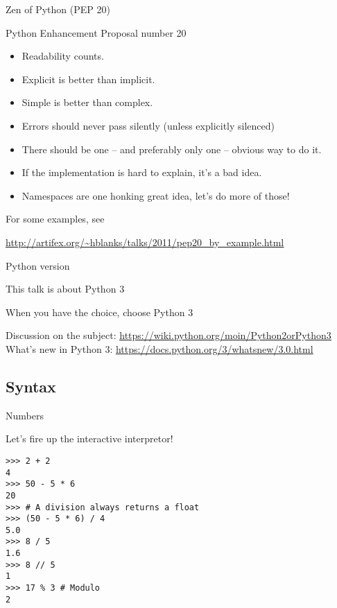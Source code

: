 \documentclass[ignorenonframetext,]{beamer}
\newcommand{\myurl}[1]{\textcolor{blue}{\underline{\url{#1}}}}
\begin{document}
\begin{frame}{Zen of Python (PEP 20)}

    Python Enhancement Proposal number 20

    \begin{itemize}[<+-| alert@+>]
        \item Readability counts.
        \item Explicit is better than implicit.
        \item Simple is better than complex.
        \item Errors should never pass silently (unless explicitly silenced)
        \item There should be one -- and preferably only one -- obvious way to do it.
        \item If the implementation is hard to explain, it's a bad idea.
        \item Namespaces are one honking great idea, let's do more of those!
    \end{itemize}
\end{frame}

\begin{frame}%

    For some examples, see

    \myurl{http://artifex.org/~hblanks/talks/2011/pep20_by_example.html}

\end{frame}

\begin{frame}{Python version}

    This talk is about {\LARGE Python} {\Huge 3}

    When you have the choice, choose Python 3

    Discussion on the subject: \myurl{https://wiki.python.org/moin/Python2orPython3}\\

    What's new in Python 3: \myurl{https://docs.python.org/3/whatsnew/3.0.html}

\end{frame}

\subsection{Syntax}

\begin{frame}[fragile]{Numbers}

    Let's fire up the interactive interpretor!

    \begin{verbatim}
>>> 2 + 2
4
>>> 50 - 5 * 6
20
>>> # A division always returns a float
>>> (50 - 5 * 6) / 4
5.0
>>> 8 / 5
1.6
>>> 8 // 5
1
>>> 17 % 3 # Modulo
2
    \end{verbatim}
\end{frame}
\end{document}
